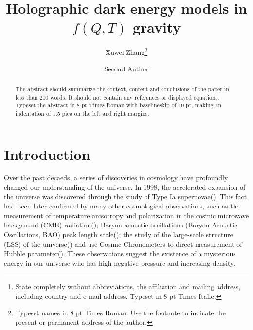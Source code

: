\documentclass{ws-mpla}
\begin{document}

\catchline{}{}{}{}{}

\title{Holographic dark energy models in $f(Q,T)$ gravity
}

\author{Xuwei Zhang\footnote{
Typeset names in 8 pt Times Roman. Use the footnote to
indicate the present or permanent address of the author.}}

\address{University Department, University Name, Address\\
City, State ZIP/Zone,
Country\footnote{State completely without abbreviations, the
affiliation and mailing address, including country and e-mail address.
Typeset in 8 pt Times Italic.}\\
author@emailaddress}

\author{Second Author}

\address{Group, Laboratory, Address\\
City, State ZIP/Zone, Country
}

\maketitle


\begin{abstract}
The abstract should summarize the context, content and conclusions of
the paper in less than 200 words. It should not contain any references
or displayed equations. Typeset the abstract in 8 pt Times Roman with
baselineskip of 10 pt, making an indentation of 1.5 pica on the left
and right margins.

\end{abstract}


\section{Introduction} \label{sec:intro}
Over the past decaeds, a series of discoveries in cosmology have profoundly changed our understanding of the universe. In 1998, the accelerated expansion of the universe was discovered through the study of Type Ia supernovae(\cite{perlmutter_discovery_1998,Riess_1998}). This fact had been later confirmed by many other cosmological observations, such as the measurement of temperature anisotropy and polarization in the cosmic microwave background (CMB) radiation(\cite{1992ApJ...396L...1S,2020Planck}); Baryon acoustic oscillations (Baryon Acoustic Oscillations, BAO) peak length scale(\cite{Eisenstein_2005,10.1111/j.1365-2966.2011.19592.x}); the study of the large-scale structure (LSS) of the universe(\cite{Dodelson_2002,Percival_2007}) and use Cosmic Chronometers to direct measurement of Hubble parameter(\cite{Daniel_Stern_2010,Moresco_2015}). These observations suggest the existence of a mysterious energy in our universe who has high negative pressure and increasing density.
\end{document}
